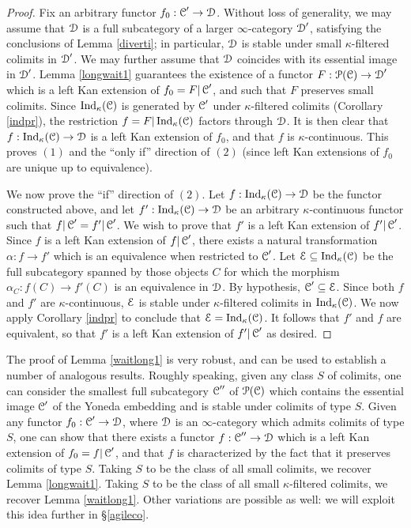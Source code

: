 \begin{proof}
Fix an arbitrary functor $f_0: \operatorname{\mathcal{C}}' \rightarrow \operatorname{\mathcal{D}}$. Without loss of generality, we may assume that $\operatorname{\mathcal{D}}$ is a full subcategory of a larger $\infty$-category $\operatorname{\mathcal{D}}'$, satisfying the conclusions of Lemma \ref{diverti}; in particular, $\operatorname{\mathcal{D}}$ is stable under small $\kappa$-filtered colimits in $\operatorname{\mathcal{D}}'$. We may further assume that $\operatorname{\mathcal{D}}$ coincides with its essential image in $\operatorname{\mathcal{D}}'$. Lemma \ref{longwait1} guarantees the existence of a functor $F: \operatorname{\mathcal{P}}(\operatorname{\mathcal{C}}) \rightarrow \operatorname{\mathcal{D}}'$ which is a left Kan extension of $f_0 = F | \operatorname{\mathcal{C}}'$, and such that $F$ preserves small colimits. 
Since $\operatorname{Ind}_{\kappa}(\operatorname{\mathcal{C}})$ is generated by $\operatorname{\mathcal{C}}'$ under $\kappa$-filtered colimits (Corollary \ref{indpr}), the restriction $f = F | \operatorname{Ind}_{\kappa}(\operatorname{\mathcal{C}})$ factors through $\operatorname{\mathcal{D}}$. It is then clear that $f: \operatorname{Ind}_{\kappa}(\operatorname{\mathcal{C}}) \rightarrow \operatorname{\mathcal{D}}$ is a left Kan extension of $f_0$, and that $f$ is $\kappa$-continuous. This proves $(1)$ and the ``only if'' direction of $(2)$ (since left Kan extensions of $f_0$ are unique up to equivalence).

We now prove the ``if'' direction of $(2)$. Let $f: \operatorname{Ind}_{\kappa}(\operatorname{\mathcal{C}}) \rightarrow \operatorname{\mathcal{D}}$ be the functor constructed above, and let $f': \operatorname{Ind}_{\kappa}(\operatorname{\mathcal{C}}) \rightarrow \operatorname{\mathcal{D}}$ be an arbitrary
$\kappa$-continuous functor such that $f | \operatorname{\mathcal{C}}'  = f' | \operatorname{\mathcal{C}}'$. We wish to prove that $f'$ is a left Kan extension of $f' | \operatorname{\mathcal{C}}'$. Since $f$ is a left Kan extension of
$f| \operatorname{\mathcal{C}}'$, there exists a natural transformation $\alpha: f \rightarrow f'$ which is an equivalence when restricted to $\operatorname{\mathcal{C}}'$. Let $\operatorname{\mathcal{E}} \subseteq \operatorname{Ind}_{\kappa}(\operatorname{\mathcal{C}})$ be the full subcategory spanned by those objects $C$ for which the morphism $\alpha_{C}: f(C) \rightarrow f'(C)$ is an equivalence in $\operatorname{\mathcal{D}}$. By hypothesis, $\operatorname{\mathcal{C}}' \subseteq \operatorname{\mathcal{E}}$. Since both $f$ and $f'$ are $\kappa$-continuous, $\operatorname{\mathcal{E}}$ is stable under $\kappa$-filtered colimits in $\operatorname{Ind}_{\kappa}(\operatorname{\mathcal{C}})$. We now apply Corollary \ref{indpr} to conclude that $\operatorname{\mathcal{E}} = \operatorname{Ind}_{\kappa}(\operatorname{\mathcal{C}})$. It follows that $f'$ and $f$ are equivalent, so that $f'$ is a left Kan extension of $f' | \operatorname{\mathcal{C}}'$ as desired.
\end{proof}

\begin{remark}\label{poweryoga}
The proof of Lemma \ref{waitlong1} is very robust, and can be used to establish a number of analogous results. Roughly speaking, given any class $S$ of colimits, one can consider the smallest full subcategory $\operatorname{\mathcal{C}}''$ of $\operatorname{\mathcal{P}}(\operatorname{\mathcal{C}})$ which contains the essential image $\operatorname{\mathcal{C}}'$ of the Yoneda embedding and is stable under colimits of type $S$. Given any functor $f_0: \operatorname{\mathcal{C}}' \rightarrow \operatorname{\mathcal{D}}$, where $\operatorname{\mathcal{D}}$ is an $\infty$-category which admits colimits of type $S$, one can show that there exists a functor $f: \operatorname{\mathcal{C}}'' \rightarrow \operatorname{\mathcal{D}}$ which is a left Kan extension of $f_0 = f| \operatorname{\mathcal{C}}'$, and that $f$ is characterized by the fact that it preserves colimits of type $S$. Taking $S$ to be the class of all small colimits, we recover Lemma \ref{longwait1}. Taking $S$ to be the class of all small $\kappa$-filtered colimits, we recover Lemma \ref{waitlong1}. Other variations are possible as well: we will exploit this idea further in \S \ref{agileco}.
\end{remark}

